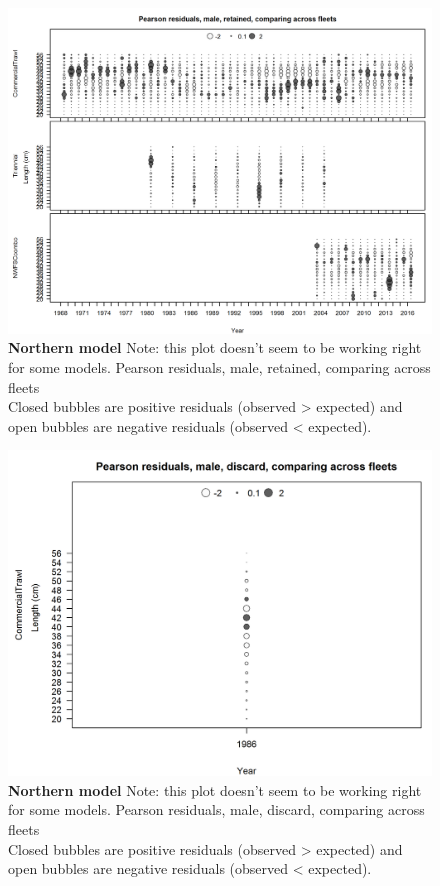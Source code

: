\documentclass[12pt,]{article}
\begin{document}
\begin{figure}[htbp]
\centering
\includegraphics{./r4ss/plots_mod1/comp_lenfit_sex3mkt2_multi-fleet_comparison.png}
\caption{\textbf{Northern model} Note: this plot doesn't seem to be
working right for some models. Pearson residuals, male, retained,
comparing across fleets\\
Closed bubbles are positive residuals (observed \textgreater{} expected)
and open bubbles are negative residuals (observed \textless{} expected).
\label{fig:mod1_36_comp_lenfit_sex3mkt2_multi-fleet_comparison}}
\end{figure}

\begin{figure}[htbp]
\centering
\includegraphics{./r4ss/plots_mod1/comp_lenfit_sex3mkt1_multi-fleet_comparison.png}
\caption{\textbf{Northern model} Note: this plot doesn't seem to be
working right for some models. Pearson residuals, male, discard,
comparing across fleets\\
Closed bubbles are positive residuals (observed \textgreater{} expected)
and open bubbles are negative residuals (observed \textless{} expected).
\label{fig:mod1_37_comp_lenfit_sex3mkt1_multi-fleet_comparison}}
\end{figure}
\end{document}
